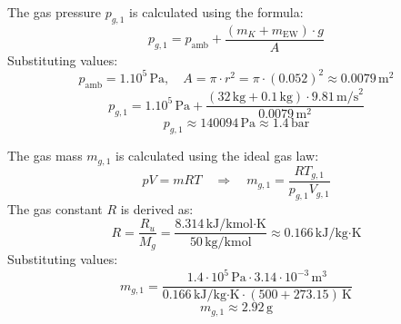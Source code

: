 The gas pressure \( p_{g,1} \) is calculated using the formula:  
\[
p_{g,1} = p_{\text{amb}} + \frac{(m_K + m_{\text{EW}}) \cdot g}{A}
\]  
Substituting values:  
\[
p_{\text{amb}} = 1.10^5 \, \text{Pa}, \quad A = \pi \cdot r^2 = \pi \cdot (0.052)^2 \approx 0.0079 \, \text{m}^2
\]  
\[
p_{g,1} = 1.10^5 \, \text{Pa} + \frac{(32 \, \text{kg} + 0.1 \, \text{kg}) \cdot 9.81 \, \text{m/s}^2}{0.0079 \, \text{m}^2}
\]  
\[
p_{g,1} \approx 140094 \, \text{Pa} \approx 1.4 \, \text{bar}
\]  

The gas mass \( m_{g,1} \) is calculated using the ideal gas law:  
\[
pV = mRT \quad \Rightarrow \quad m_{g,1} = \frac{RT_{g,1}}{p_{g,1} V_{g,1}}
\]  
The gas constant \( R \) is derived as:  
\[
R = \frac{R_u}{M_g} = \frac{8.314 \, \text{kJ/kmol·K}}{50 \, \text{kg/kmol}} \approx 0.166 \, \text{kJ/kg·K}
\]  
Substituting values:  
\[
m_{g,1} = \frac{1.4 \cdot 10^5 \, \text{Pa} \cdot 3.14 \cdot 10^{-3} \, \text{m}^3}{0.166 \, \text{kJ/kg·K} \cdot (500 + 273.15) \, \text{K}}
\]  
\[
m_{g,1} \approx 2.92 \, \text{g}
\]